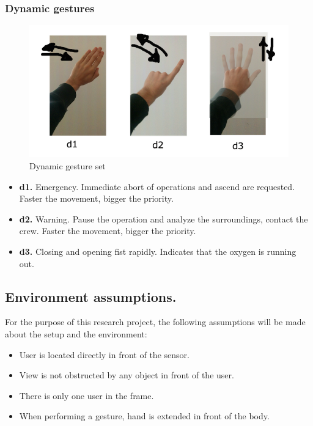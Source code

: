 \documentclass[a4paper,11pt,oneside]{article}
\begin{document}
    \subsubsection{Dynamic gestures}
    
  \begin{figure}[H]
  \centering
  \includegraphics[scale=0.5]{dynamic-gestureset.png}
  \caption{Dynamic gesture set}
  \end{figure}
  
  \begin{itemize}
    \item \textbf{d1.} Emergency. Immediate abort of operations and ascend are requested. Faster the movement, bigger the priority.
    \item \textbf{d2.} Warning. Pause the operation and analyze the surroundings, contact the crew. Faster the movement, bigger the priority.
    \item \textbf{d3.} Closing and opening fist rapidly. Indicates that the oxygen is running out.
    \end{itemize}

\subsection{Environment assumptions.}

  For the purpose of this research project, the following assumptions will be made about the setup and the environment:\\
  
  \begin{itemize}
  \item User is located directly in front of the sensor.
  \item View is not obstructed by any object in front of the user.
  \item There is only one user in the frame.
  \item When performing a gesture, hand is extended in front of the body.
  \end{itemize}
\end{document}
